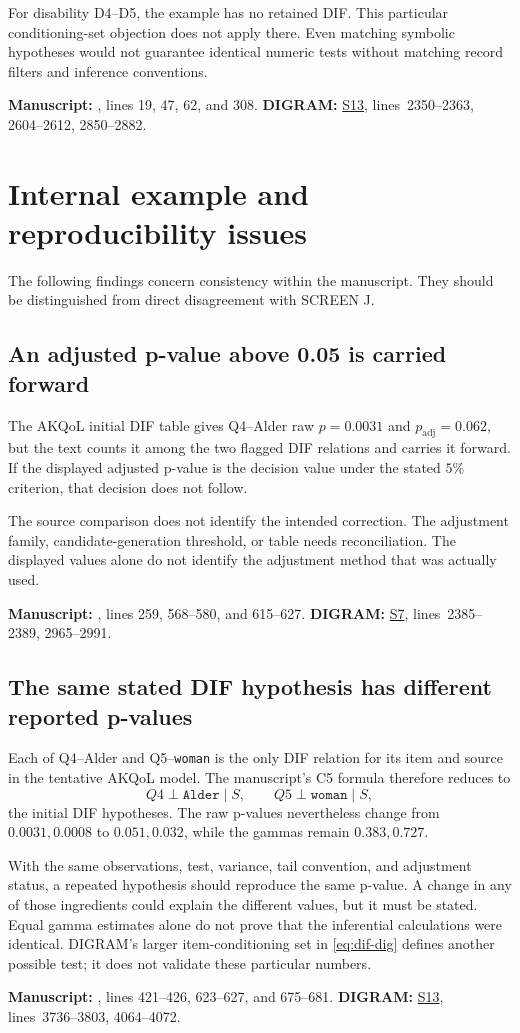 \documentclass[11pt,a4paper]{article}
\newcommand{\ind}{\perp}
\newcommand{\src}[2]{\hyperlink{source-#1}{\textsf{#1}}, lines~#2}
\newcommand{\trace}[2]{%
  \par\smallskip
  {\footnotesize\color{tracegray}\textbf{Manuscript:} #1.\quad
  \textbf{DIGRAM:} #2.\par}\medskip}
\newcommand{\finding}[1]{\Needspace{5\baselineskip}\subsection{#1}}
\begin{document}
For disability D4--D5, the example has no retained DIF. This particular
conditioning-set objection does not apply there.
Even matching symbolic hypotheses would not guarantee identical numeric
tests without matching record filters and inference conventions.
\trace{, lines 19, 47, 62, and 308}
{\src{S13}{2350--2363, 2604--2612, 2850--2882}}

\section{Internal example and reproducibility issues}
\label{sec:exampleissues}
The following findings concern consistency within the manuscript.
They should be distinguished from direct disagreement with SCREEN J.

\finding{An adjusted p-value above 0.05 is carried forward}
The AKQoL initial DIF table gives Q4--Alder raw \(p=0.0031\) and
\(p_{\mathrm{adj}}=0.062\), but the text counts it among the two flagged
DIF relations and carries it forward.
If the displayed adjusted p-value is the decision value under the stated
\(5\%\) criterion, that decision does not follow.

The source comparison does not identify the intended correction.
The adjustment family, candidate-generation threshold, or table needs
reconciliation. The displayed values alone do not identify the adjustment
method that was actually used.
\trace{, lines 259, 568--580, and 615--627}
{\src{S7}{2385--2389, 2965--2991}}

\finding{The same stated DIF hypothesis has different reported p-values}
Each of Q4--Alder and Q5--\texttt{woman} is the only DIF relation for its
item and source in the tentative AKQoL model.
The manuscript's C5 formula therefore reduces to
\[
 Q4\ind\texttt{Alder}\mid S,\qquad
 Q5\ind\texttt{woman}\mid S,
\]
the initial DIF hypotheses.
The raw p-values nevertheless change from \(0.0031,0.0008\) to
\(0.051,0.032\), while the gammas remain \(0.383,0.727\).

With the same observations, test, variance, tail convention, and adjustment
status, a repeated hypothesis should reproduce the same p-value.
A change in any of those ingredients could explain the different values,
but it must be stated. Equal gamma estimates alone do not prove that the
inferential calculations were identical.
DIGRAM's larger item-conditioning set in \eqref{eq:dif-dig} defines another
possible test; it does not validate these particular numbers.
\trace{, lines 421--426, 623--627, and 675--681}
{\src{S13}{3736--3803, 4064--4072}}
\end{document}

